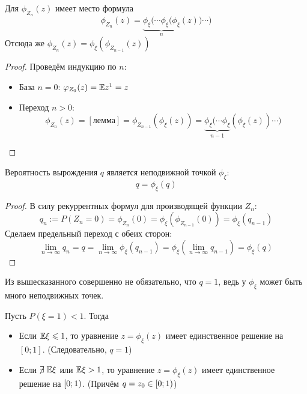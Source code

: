 \begin{corollary}
	Для $\phi_{Z_n}(z)$ имеет место формула
	\[
		\phi_{Z_n}(z) = \underbrace{\phi_\xi(\cdots \phi_\xi(\phi_\xi}_{n}(z)) \cdots)
	\]
	Отсюда же $\phi_{Z_n}(z) = \phi_\xi(\phi_{Z_{n - 1}}(z))$
\end{corollary}

\begin{proof}
	Проведём индукцию по $n$:
	\begin{itemize}
		\item База $n = 0$: $\varphi_{Z_0}(z) = \mathbb{E} z^1 = z$
		
		\item Переход $n > 0$:
		\[
			\phi_{Z_n}(z) = [\text{лемма}] = \phi_{Z_{n - 1}}(\phi_\xi(z)) = \underbrace{\phi_\xi(\cdots \phi_\xi}_{n - 1}(\phi_\xi(z)) \cdots)
		\]
	\end{itemize}
\end{proof}

\begin{lemma}
	Вероятность вырождения $q$ является неподвижной точкой $\phi_\xi$:
	\[
		q = \phi_\xi(q)
	\]
\end{lemma}

\begin{proof}
	В силу рекуррентных формул для производящей функции $Z_n$:
	\[
		q_n := P(Z_n = 0) = \phi_{Z_n}(0) = \phi_\xi(\phi_{Z_{n - 1}}(0)) = \phi_\xi(q_{n - 1})
	\]
	Сделаем предельный переход с обеих сторон:
	\[
		\lim_{n \to \infty} q_n = q = \lim_{n \to \infty} \phi_\xi(q_{n - 1}) = \phi_\xi(\lim_{n \to \infty} q_{n - 1}) = \phi_\xi(q)
	\]
\end{proof}

\begin{note}
	Из вышесказанного совершенно не обязательно, что $q = 1$, ведь у $\phi_\xi$ может быть много неподвижных точек.
\end{note}

\begin{theorem}
	Пусть $P(\xi = 1) < 1$. Тогда
	\begin{itemize}
		\item Если $\mathbb{E}\xi \leqslant 1$, то уравнение $z = \phi_\xi(z)$ имеет единственное решение на $[0; 1]$. (Следовательно, $q = 1$)
		
		\item Если $\centernot\exists \E\xi$ или $\mathbb{E}\xi > 1$, то уравнение $z = \phi_\xi(z)$ имеет единственное решение на $\left[0; 1\right)$. (Причём $q = z_0 \in \left[0; 1\right)$)
	\end{itemize}
\end{theorem}

